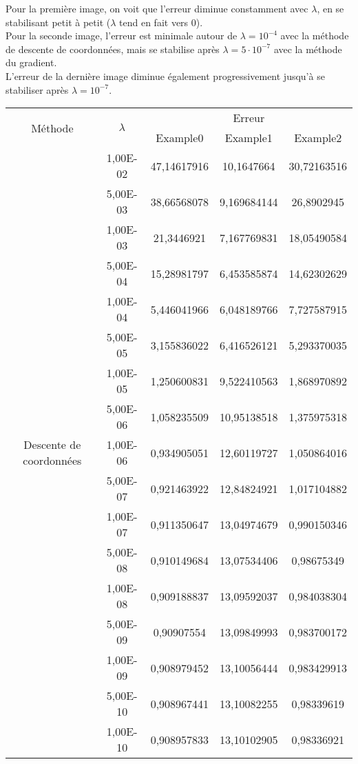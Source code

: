 \documentclass[12pt, a4paper]{report}
\begin{document}
Pour la première image, on voit que l'erreur diminue constamment avec $\lambda$, en se stabilisant petit à petit ($\lambda$ tend en fait vers 0). \\
Pour la seconde image, l'erreur est minimale autour de $\lambda = 10^{-4}$ avec la méthode de descente de coordonnées, mais se stabilise après $\lambda = 5\cdot10^{-7}$ avec la méthode du gradient. \\
L'erreur de la dernière image diminue également progressivement jusqu'à se stabiliser après $\lambda = 10^{-7}$.

\begin{center}
\begin{tabular}{|c|c|c|c|c|}
\hline
\multirow{2}{*}{Méthode} & \multirow{2}{*}{$\lambda$} & \multicolumn{3}{|c|}{Erreur} \\\cline{3-5}
 & & Example0 & Example1 & Example2 \\
 \hline
\multirow{18}{*}{Descente de coordonnées} & 1,00E-02 & 47,14617916 & 10,1647664 & 30,72163516 \\
 & 5,00E-03 & 38,66568078 & 9,169684144 & 26,8902945 \\
 & 1,00E-03 & 21,3446921 & 7,167769831 & 18,05490584 \\
 & 5,00E-04 & 15,28981797 & 6,453585874 & 14,62302629 \\
 & 1,00E-04 & 5,446041966 & 6,048189766 & 7,727587915 \\
 & 5,00E-05 & 3,155836022 & 6,416526121 & 5,293370035 \\
 & 1,00E-05 & 1,250600831 & 9,522410563 & 1,868970892 \\
 & 5,00E-06 & 1,058235509 & 10,95138518 & 1,375975318 \\
 & 1,00E-06 & 0,934905051 & 12,60119727 & 1,050864016 \\
 & 5,00E-07 & 0,921463922 & 12,84824921 & 1,017104882 \\
 & 1,00E-07 & 0,911350647 & 13,04974679 & 0,990150346 \\
 & 5,00E-08 & 0,910149684 & 13,07534406 & 0,98675349 \\
 & 1,00E-08 & 0,909188837 & 13,09592037 & 0,984038304 \\
 & 5,00E-09 & 0,90907554 & 13,09849993 & 0,983700172 \\
 & 1,00E-09 & 0,908979452 & 13,10056444 & 0,983429913 \\
 & 5,00E-10 & 0,908967441 & 13,10082255 & 0,98339619 \\
 & 1,00E-10 & 0,908957833 & 13,10102905 & 0,98336921 \\

\end{tabular}
\end{center}
\end{document}
